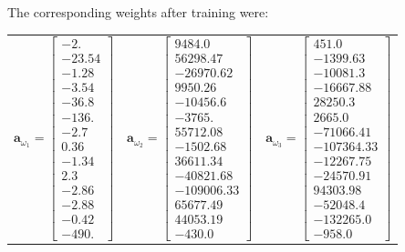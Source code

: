 \documentclass{article}
\newcommand{\mbf}[1]{\ensuremath{\mathbf{#1}}}
\begin{document}
The corresponding weights after training were:
\begin{center}
\begin{tabular}{ ccc }
$\mbf{a}_{\omega_1} = \left[\begin{matrix}
-2.\\-23.54\\-1.28\\-3.54\\-36.8\\-136.\\-2.7\\0.36\\-1.34\\2.3\\-2.86\\-2.88\\-0.42\\-490.
\end{matrix}\right]$ &
$\mbf{a}_{\omega_2} = \left[\begin{matrix}
9484.0\\56298.47\\-26970.62\\9950.26\\-10456.6\\-3765.\\55712.08\\-1502.68\\36611.34\\-40821.68\\-109006.33\\65677.49\\44053.19\\-430.0
\end{matrix}\right]$ &
$\mbf{a}_{\omega_3} = \left[\begin{matrix}
451.0\\-1399.63\\-10081.3\\-16667.88\\28250.3\\2665.0\\-71066.41\\-107364.33\\-12267.75\\-24570.91\\94303.98\\-52048.4\\-132265.0\\-958.0
\end{matrix}\right]$
\end{tabular}
\end{center}
\end{document}
